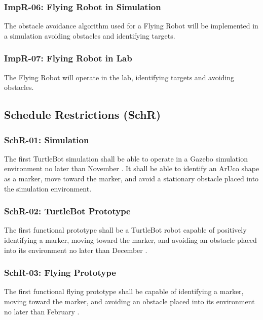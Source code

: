 \documentclass{article}
\begin{document}
		\subsubsection{ImpR-06: Flying Robot in Simulation}
		
		The obstacle avoidance algorithm used for a Flying Robot will be implemented in a simulation avoiding obstacles and identifying targets.
		
		\subsubsection{ImpR-07: Flying Robot in Lab}
		
		The Flying Robot will operate in the lab, identifying targets and avoiding obstacles.
		
	\subsection{Schedule Restrictions (SchR)}
	
		\subsubsection{SchR-01: Simulation}
		
		The first TurtleBot simulation shall be able to operate in a Gazebo simulation environment no later than November . It shall be able to identify an ArUco shape as a marker, move toward the marker, and avoid a stationary obstacle placed into the simulation environment.
		
		\subsubsection{SchR-02: TurtleBot Prototype}
		
		The first functional prototype shall be a TurtleBot robot capable of positively identifying a marker, moving toward the marker, and avoiding an obstacle placed into its environment no later than December .
		
		\subsubsection{SchR-03: Flying Prototype}
		
		The first functional flying prototype shall be capable of identifying a marker, moving toward the marker, and avoiding an obstacle placed into its environment no later than February  .
\end{document}
